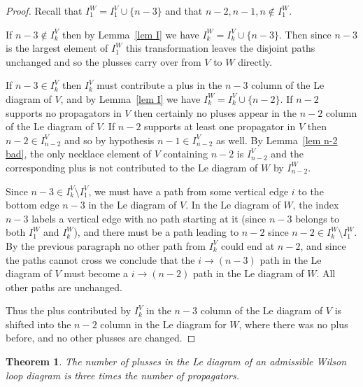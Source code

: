\documentclass[11pt]{article}
\newtheorem{thm}{Theorem}[section]
\theoremstyle{remark}
\theoremstyle{definition}
\begin{document}
\begin{proof}
Recall that $I_1^W = I_1^V\cup \{n-3\}$ and that $n-2,n-1,n \not\in I_1^W$.

  If $n-3\not\in I_{k}^{V}$ then by Lemma~\ref{lem I} we have $I_{k}^{W} = I_k^{V}\cup \{n-3\}$.  Then since $n-3$ is the largest element of $I_1^{W}$ this transformation leaves the disjoint paths unchanged and so the plusses carry over from $V$ to $W$ directly.

  If $n-3\in I_{k}^{V}$ then $I_k^V$ must contribute a plus in the $n-3$ column of the Le diagram of $V$, and by Lemma~\ref{lem I} we have $I_{k}^{W} = I_k^{V}\cup \{n-2\}$. If $n-2$ supports no propagators in $V$ then certainly no pluses appear in the $n-2$ column of the Le diagram of $V$. If $n-2$ supports at least one propagator in $V$ then $n-2 \in I_{n-2}^V$ and so by hypothesis $n-1 \in I_{n-2}^V$ as well. By Lemma~\ref{lem n-2 bad}, the only necklace element of $V$ containing $n-2$ is $I_{n-2}^{V}$ and the corresponding plus is not contributed to the Le diagram of $W$ by $I_{n-2}^{W}$.

  Since $n-3 \in I_k^V \setminus I_1^V$, we must have a path from some vertical edge $i$ to the bottom edge $n-3$ in the Le diagram of $V$.  In the Le diagram of $W$, the index $n-3$ labels a vertical edge with no path starting at it (since $n-3$ belongs to both $I_1^W$ and $I_k^W$), and there must be a path leading to $n-2$ since $n-2 \in I_k^W \setminus I_1^W$.  By the previous paragraph no other path from $I_k^V$ could end at $n-2$, and since the paths cannot cross we conclude that the $i\rightarrow (n-3)$ path in the Le diagram of $V$ must become a $i\rightarrow (n-2)$ path in the Le diagram of $W$. All other paths are unchanged.

   Thus the plus contributed by $I_k^V$ in the $n-3$ column of the Le diagram of $V$ is shifted into the $n-2$ column in the Le diagram for $W$, where there was no plus before, and no other plusses are changed.
\end{proof}

\begin{thm}\label{thm dim}
  The number of plusses in the Le diagram of an admissible Wilson loop diagram is three times the number of propagators.
\end{thm}
\end{document}
